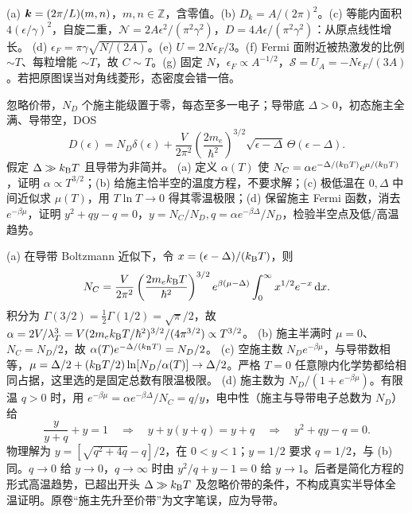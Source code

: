 \begin{solution}
(a) $\boldsymbol{k}=(2\pi/L)(m,n)$，$m,n\in\mathbb Z$，含零值。(b) $D_k=A/(2\pi)^2$。(c) 等能内面积 $4(\epsilon/\gamma)^2$，自旋二重，$\mathcal N=2A\epsilon^2/(\pi^2\gamma^2)$，$D=4A\epsilon/(\pi^2\gamma^2)$：从原点线性增长。
(d) $\epsilon_F=\pi\gamma\sqrt{N/(2A)}$。(e) $U=2N\epsilon_F/3$。(f) Fermi 面附近被热激发的比例 $\sim T$、每粒增能 $\sim T$，故 $C\sim T$。(g) 固定 $N$，$\epsilon_F\propto A^{-1/2}$，$\mathcal S=U_A=-N\epsilon_F/(3A)$。若把原图误当对角线菱形，态密度会错一倍。
\end{solution}
\begin{center}\hspace{1cm}\end{center}
\begin{exercise}
忽略价带，$N_D$ 个施主能级置于零，每态至多一电子；导带底 $\Delta>0$，初态施主全满、导带空，DOS
\[D(\epsilon)=N_D\delta(\epsilon)+\frac V{2\pi^2}\left(\frac{2m_e}{\hbar^2}\right)^{3/2}\sqrt{\epsilon-\Delta}\,\Theta(\epsilon-\Delta).\]
假定 $\Delta\gg k_{\mathrm B} T$ 且导带为非简并。
(a) 定义 $\alpha(T)$ 使 $N_C=\alpha e^{-\Delta/(k_{\mathrm B} T)}e^{\mu/(k_{\mathrm B} T)}$，证明 $\alpha\propto T^{3/2}$；(b) 给施主恰半空的温度方程，不要求解；(c) 极低温在 $0,\Delta$ 中间近似求 $\mu(T)$，用 $T\ln T\to0$ 得其零温极限；(d) 保留施主 Fermi 函数，消去 $e^{-\beta\mu}$，证明 $y^2+qy-q=0$，$y=N_C/N_D,q=\alpha e^{-\beta\Delta}/N_D$，检验半空点及低/高温趋势。
\end{exercise}
\begin{solution}
(a) 在导带 Boltzmann 近似下，令 $x=(\epsilon-\Delta)/(k_{\mathrm B} T)$，则
\[N_C=\frac V{2\pi^2}\left(\frac{2m_ek_{\mathrm B} T}{\hbar^2}\right)^{3/2}
e^{\beta(\mu-\Delta)}\int_0^\infty x^{1/2}e^{-x}\,\mathrm d x.\]
积分为 $\Gamma(3/2)=\tfrac12\Gamma(1/2)=\sqrt\pi/2$，故 $\alpha=2V/\lambda_T^3=V(2m_ek_{\mathrm B} T/\hbar^2)^{3/2}/(4\pi^{3/2})\propto T^{3/2}$。
(b) 施主半满时 $\mu=0$、$N_C=N_D/2$，故 $\alpha(T)e^{-\Delta/(k_{\mathrm B} T)}=N_D/2$。
(c) 空施主数 $N_De^{-\beta\mu}$，与导带数相等，$\mu=\Delta/2+(k_{\mathrm B} T/2)\ln[N_D/\alpha(T)]\to\Delta/2$。严格 $T=0$ 任意隙内化学势都给相同占据，这里选的是固定总数有限温极限。
(d) 施主数为 $N_D/(1+e^{-\beta\mu})$。有限温 $q>0$ 时，用 $e^{-\beta\mu}=\alpha e^{-\beta\Delta}/N_C=q/y$，电中性（施主与导带电子总数为 $N_D$）给
\[\frac{y}{y+q}+y=1
\quad\Longrightarrow\quad y+y(y+q)=y+q
\quad\Longrightarrow\quad y^2+qy-q=0.\]
物理解为 $y=[\sqrt{q^2+4q}-q]/2$，在 $0<y<1$；$y=1/2$ 要求 $q=1/2$，与 (b) 同。$q\to0$ 给 $y\to0$，$q\to\infty$ 时由 $y^2/q+y-1=0$ 给 $y\to1$。后者是简化方程的形式高温趋势，已超出开头 $\Delta\gg k_{\mathrm B} T$ 及忽略价带的条件，不构成真实半导体全温证明。原卷“施主先升至价带”为文字笔误，应为导带。
\end{solution}
